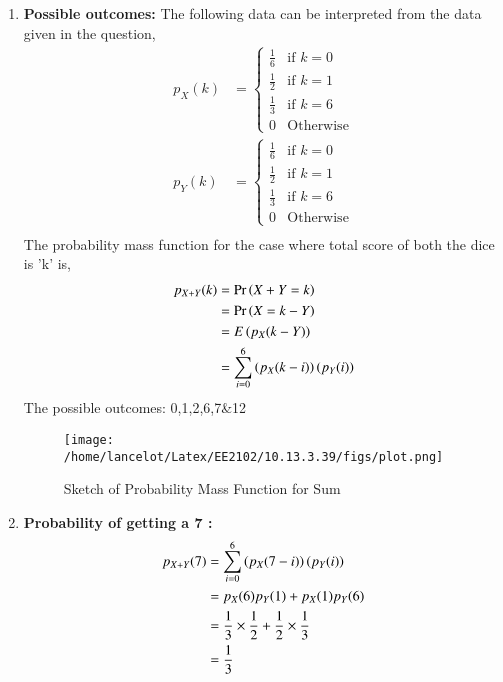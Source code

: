 \documentclass[journal,12pt,twocolumn]{IEEEtran}
\theoremstyle{remark}
\begin{document}
\begin{enumerate}
\item \textbf{Possible outcomes:} The following data can be interpreted from the data given in the question,
	\begin{align}
		p_X(k) &= 
		\begin{cases}
			\frac{1}{6} & \text{if } k = 0 \\
			\frac{1}{2} & \text{if } k = 1 \\
			\frac{1}{3} & \text{if } k = 6 \\
			0 & \text{Otherwise}
		\end{cases}
		\\p_Y(k) &= 
		\begin{cases}
			\frac{1}{6} & \text{if } k = 0 \\
			\frac{1}{2} & \text{if } k = 1 \\
			\frac{1}{3} & \text{if } k = 6 \\
			0 & \text{Otherwise}
		\end{cases}\\
	\end{align}
	The probability mass function for the case where total score of both the dice is 'k' is,
	\begin{align}
		p_{X+Y}(k) &= \Pr\left(X+Y=k\right)\\
			&= \Pr\left(X=k-Y\right)\\
			&= E\left(p_X(k-Y)\right)\\
			&= \sum_{i=0}^{6}\left(p_X(k-i)\right)\left(p_Y(i)\right)
	\end{align}
	The possible outcomes: 0,1,2,6,7\&12
\begin{figure}[h!]
        \texttt{[image: /home/lancelot/Latex/EE2102/10.13.3.39/figs/plot.png]}
        \caption{Sketch of Probability Mass Function for Sum} 
\end{figure}
\item \textbf{Probability of getting a 7 :} 
	\begin{align}
		p_{X+Y}(7) &= \sum_{i=0}^{6}\left(p_X(7-i)\right)\left(p_Y(i)\right)\\
			&= p_X(6)p_Y(1) + p_X(1)p_Y(6)\\
			&= \frac{1}{3}\times\frac{1}{2} + \frac{1}{2}\times\frac{1}{3}\\
			&= \frac{1}{3}
	\end{align}
\end{enumerate}
\end{document}
